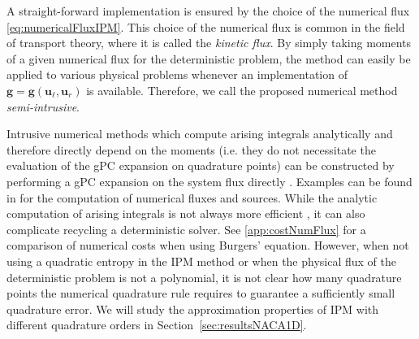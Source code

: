A straight-forward implementation is ensured by the choice of the numerical flux \eqref{eq:numericalFluxIPM}. This choice of the numerical flux is common in the field of transport theory, where it is called the \textit{kinetic flux}. By simply taking moments of a given numerical flux for the deterministic problem, the method can easily be applied to various physical problems whenever an implementation of $\bm g = \bm g(\bm u_\ell, \bm u_r)$ is available. Therefore, we call the proposed numerical method \textit{semi-intrusive}.

Intrusive numerical methods which compute arising integrals analytically and therefore directly depend on the moments (i.e. they do not necessitate the evaluation of the gPC expansion on quadrature points) can be constructed by performing a gPC expansion on the system flux directly \cite{debusschere2004numerical}. Examples can be found in \cite{hu2015stochastic,hu2016stochastic,tryoen2010instrusive,durrwachterahigh} for the computation of numerical fluxes and sources. While the analytic computation of arising integrals is not always more efficient \cite[Section 6]{ghanem1998stochastic}, it can also complicate recycling a deterministic solver. See \ref{app:costNumFlux} for a comparison of numerical costs when using Burgers' equation. However, when not using a quadratic entropy in the IPM method or when the physical flux of the deterministic problem is not a polynomial, it is not clear how many quadrature points the numerical quadrature rule requires to guarantee a sufficiently small quadrature error. We will study the approximation properties of IPM with different quadrature orders in Section~\ref{sec:resultsNACA1D}.